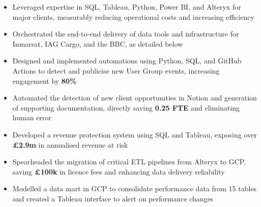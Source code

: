 	\begin{paracol}{2}
		\begin{itemize}
			\item Leveraged expertise in SQL, Tableau, Python, Power BI, and Alteryx for major clients,
				measurably reducing operational costs and increasing efficiency

			\item Orchestrated the end-to-end delivery of data tools and infrastructure for Inmarsat, IAG
				Cargo, and the BBC, as detailed below

			\item Designed and implemented automations using Python, SQL, and GitHub Actions to detect and
				publicise new User Group events, increasing engagement by \textbf{80\%}

			\item Automated the detection of new client opportunities in Notion and generation of supporting
				documentation, directly saving \textbf{0.25 FTE} and eliminating human error
				
      \medskip

			      
		\end{itemize}

		\divider

		\begin{itemize}
			\item Developed a revenue protection system using SQL and Tableau, exposing over \textbf{£2.9m}
				in annualised revenue at risk

			\item Spearheaded the migration of critical ETL pipelines from Alteryx to GCP, saving \textbf{£100k}
				in licence fees and enhancing data delivery reliability

			\item Modelled a data mart in GCP to consolidate performance data from 15 tables and created a
				Tableau interface to alert on performance changes


\end{itemize}
\end{paracol}
